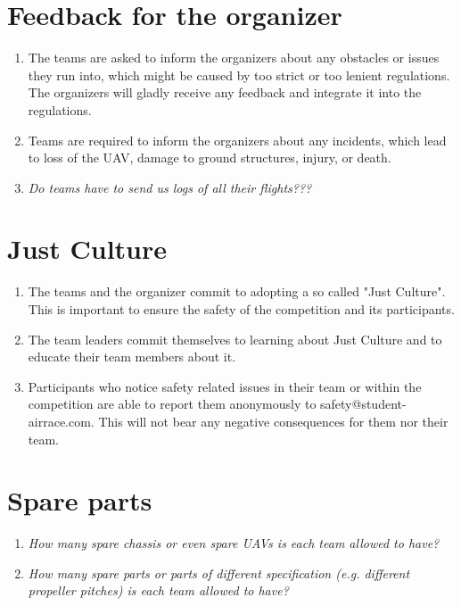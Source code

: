     \section{Feedback for the organizer}
    \begin{enumerate}
      \item The teams are asked to inform the organizers about any obstacles or issues they run into, which might be caused by
      too strict or too lenient regulations. The organizers will gladly receive any feedback and integrate it into the regulations. 
      \item Teams are required to inform the organizers about any incidents, which lead to loss of the UAV, damage to ground structures, injury, or death. 
      \item \emph{Do teams have to send us logs of all their flights???}
    \end{enumerate}

    \section{Just Culture}
    \begin{enumerate}
      \item The teams and the organizer commit to adopting a so called "Just Culture". This is important to ensure the safety of the competition and its participants.
      \item The team leaders commit themselves to learning about Just Culture and to educate their team members about it.
      \item Participants who notice safety related issues in their team or within the competition are able to report them anonymously  to safety@student-airrace.com. This will not bear any
      negative consequences for them nor their team. 
    \end{enumerate}

    \section{Spare parts}
    \begin{enumerate}
      \item \emph{How many spare chassis or even spare UAVs is each team allowed to have?}
      \item \emph{How many spare parts or parts of different specification (e.g. different propeller pitches) is each team allowed to have?}
    \end{enumerate}

